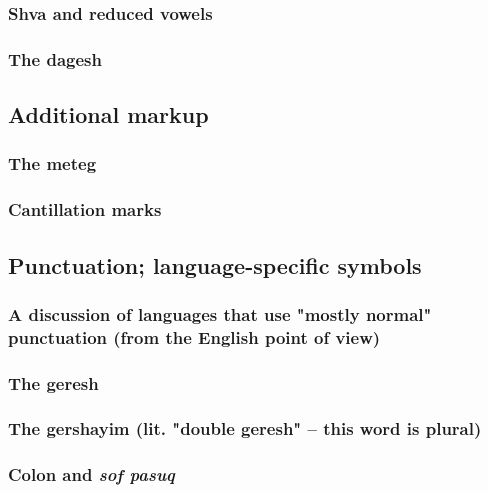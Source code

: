 \documentclass[11pt]{article}
\begin{document}
\subsubsection{Shva and reduced vowels}
\label{sec:orgca5249c}

\subsubsection{The dagesh}
\label{sec:org2783876}

\subsection{Additional markup}
\label{sec:orgbd8b41b}

\subsubsection{The meteg}
\label{sec:orgcf96d56}

\subsubsection{Cantillation marks}
\label{sec:org17092c9}

\subsection{Punctuation; language-specific symbols}
\label{sec:org0942448}

\subsubsection{A discussion of languages that use "mostly normal" punctuation (from the English point of view)}
\label{sec:orgfcebb2f}

\subsubsection{The geresh}
\label{sec:orgbaaedb3}

\subsubsection{The gershayim (lit. "double geresh" -- this word is plural)}
\label{sec:orgcf56833}

\subsubsection{Colon and \emph{sof pasuq}}
\label{sec:orgda46652}
\end{document}

